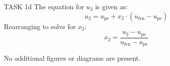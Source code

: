 TASK 1d  
The equation for \( u_2 \) is given as:  
\[
u_2 = u_{\text{pe}} + x_2 \cdot (u_{\text{fen}} - u_{\text{pe}})
\]  
Rearranging to solve for \( x_2 \):  
\[
x_2 = \frac{u_2 - u_{\text{pe}}}{u_{\text{fen}} - u_{\text{pe}}}
\]  

No additional figures or diagrams are present.